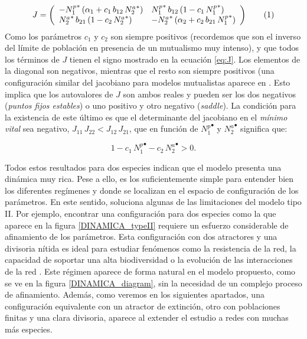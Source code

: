 \begin{equation}
J = \left(
\begin{array}{ll}
- {N^{p}_{1}}^* \, (\alpha_{1}+ c_{1}\, b_{12} \, {N^a_2}^* )  & {N_{1}^{p}}^* \, b_{12} \, (1 - c_{1}\, {N_{1}^{p}}^* ) \\
{N_{2}^{a}}^* \, b_{21}\, (1 - c_{2}\, {N_{2}^{a}}^* ) & - {N_{2}^{a}}^* \, (\alpha_{2}+ c_{2}\,b_{21}\,{N_{1}^{p}}^* )
\end{array}
\right)\stepcounter{equation}\tag{\theequation}\label{eq:J}
\end{equation}
Como los parámetros $c_{1}$ y $c_2$ son siempre positivos (recordemos que son el inverso del límite de población en presencia de un mutualismo muy intenso), y que todos los términos de $J$ tienen el signo mostrado en la ecuación \ref{eq:J}. Los elementos de la diagonal son negativos, mientras que el resto son siempre positivos (una configuración similar del jacobiano para modelos mutualistas aparece en \cite{goh1979}. Esto implica que los autovalores de $J$ son ambos reales y pueden ser los dos negativos (\textit{puntos fijos estables}) o uno positivo y otro negativo (\textit{saddle}). La condición para la existencia de este último es que el determinante del jacobiano en el \textit{mínimo vital} sea negativo, $J_{11} \, J_{22} < J_{12}\, J_{21}$, que en función de ${N_{1}^{p}}^\bullet$ y ${N_{2}^{a}}^\bullet$ significa que:

\begin{equation}
1-c_{1}\, {N_{1}^{p}}^\bullet - c_{2}\, {N_{2}^{a}}^\bullet > 0 .
\end{equation}

Todos estos resultados para dos especies indican que el modelo presenta una dinámica muy rica. Pese a ello, es los suficientemente simple para entender bien los diferentes regímenes y donde se localizan en el espacio de configuración de los parámetros. En este sentido, soluciona algunas de las limitaciones del modelo tipo II. Por ejemplo, encontrar una configuración para dos especies como la que aparece en la figura \ref{DINAMICA_typeII} requiere un esfuerzo considerable de afinamiento de los parámetros. Esta configuración con dos atractores y una divisoria nítida es ideal para estudiar fenómenos como la resistencia de la red, la capacidad de soportar una alta biodiversidad o la evolución de las interacciones de la red \cite{bastolla2009, suweis2013emergence}. Este régimen aparece de forma natural en el modelo propuesto, como se ve en la figura \ref{DINAMICA_diagram}, sin la necesidad de un complejo proceso de afinamiento. Además, como veremos en los siguientes apartados, una configuración equivalente con un atractor de extinción, otro con poblaciones finitas y una clara divisoria, aparece al extender el estudio a redes con muchas más
especies.

